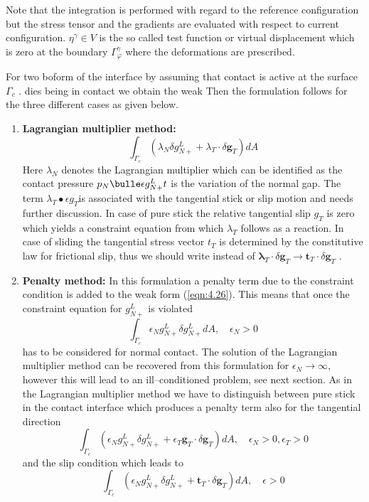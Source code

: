 Note that the integration is performed with regard to the reference conﬁguration but the
stress tensor and the gradients are evaluated with respect to current conﬁguration. $\eta^\gamma \in V$
is the so called test function or virtual displacement which is zero at the boundary $\Gamma_\varphi^\gamma$ where
the deformations are prescribed.

For two boform of the interface by assuming that contact is active at the surface $\Gamma_c$ . dies being in contact we obtain the weak Then the formulation follows for the three diﬀerent
cases as given below.
\begin{enumerate}
    \item \textbf{Lagrangian multiplier method:}
    \begin{equation}
 \int_{\Gamma_{c}}\left(\lambda_{N} \delta g_{N+}^{L}+\lambda_{T} \cdot \delta \mathbf{g}_{T}\right) d A 
 \label{eqn:4.31} 
\end{equation}
Here $\lambda_N$ denotes the Lagrangian multiplier which can be identiﬁed as the contact
 pressure $p_N \bulle \epsilon g_{N+}^Lt$ is the variation of the normal gap. The term $\lambda _T \bullet \epsilon g _T $is associated with
the tangential stick or slip motion and needs further discussion. In case of pure stick
the relative tangential slip $g _T$ is zero which yields a constraint equation from which $\lambda _T$
follows as a reaction. In case of sliding the tangential stress vector $t _T$ is determined
by the constitutive law for frictional slip,  thus we should write
instead of $\boldsymbol{\lambda}_{T} \cdot \delta \mathbf{g}_{T} \longrightarrow \mathbf{t}_{T} \cdot \delta \mathbf{g}_{T} $ .

\item \textbf{Penalty method:}
In this formulation a penalty term due to the constraint condition is added to the
weak form (\ref{eqn:4.26}). This means that once the constraint equation for $g_{N+}^L$ is violated
\begin{equation}
 \int_{\Gamma_{c}} \epsilon_{N} g_{N+}^{L} \delta g_{N+}^{L} d A, \quad \epsilon_{N}>0 
    \label{eqn:4.32} 
\end{equation}
has to be considered for normal contact. The solution of the Lagrangian multiplier method can be recovered from this
formulation for $\epsilon_N \rightarrow \infty$, however this will lead to an ill–conditioned problem, see next section. As in the Lagrangian multiplier method we have to distinguish between
pure stick in the contact interface which produces a penalty term also for the tangential
direction
\begin{equation}
 \int_{\Gamma_{c}}\left(\epsilon_{N} g_{N+}^{L} \delta g_{N+}^{L}+\epsilon_{T} \mathbf{g}_{T} \cdot \delta \mathbf{g}_{T}\right) d A, \quad \epsilon_{N}>0, \epsilon_{T}>0 
 \label{eqn:4.33} 
\end{equation}
and the slip condition which leads to
\begin{equation}
 \int_{\Gamma_{c}}\left(\epsilon_{N} g_{N+}^{L} \delta g_{N+}^{L}+\mathbf{t}_{T} \cdot \delta \mathbf{g}_{T}\right) d A, \quad \epsilon>0 
 \label{eqn:4.34} 
\end{equation}


\end{enumerate}
